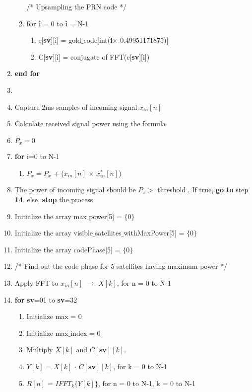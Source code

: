 \documentclass[journal,10pt,onecolumn]{article}
\begin{document}
\begin{enumerate}
\begin{enumerate}
    /* Upsampling the PRN code */
        \item[] \textbf{for} \textbf{i} = 0 to \textbf{i} = N-1
        \begin{enumerate}
            \item[] c[\textbf{sv}][i] = gold$\_$code[int(\textbf{i}$\times$ 0.49951171875)]
            \item[] C[\textbf{sv}][i] = conjugate of FFT(c[\textbf{sv}][i]) 
        \end{enumerate}
    \end{enumerate}
    \item[] \textbf{end for}
    \item[] \item Capture 2ms samples of incoming signal $x_{in}[n]$
    \item Calculate received signal power using the formula
    \item[] $P_x=0$
    \item[] \textbf{for} i=0 to N-1
    \begin{enumerate}
        \item[] $P_x= P_x$ + ($x_{in}[n]$ $\times$ $x^*_{in}[n]$)
    \end{enumerate} 
    \item The power of incoming signal should be $P_x$$>$ threshold . If true, \textbf{go to} step \textbf{14}. else, \textbf{stop} the process
    \item Initialize the array max$\_$power[5] = $\{0\}$
    \item Initialize the array visible$\_$satellites$\_$withMaxPower[5] = $\{0\}$
    \item Initialize the array codePhase[5] = $\{0\}$
    \item [] /* Find out the code phase for 5 satellites having maximum power */
    \item Apply FFT to $x_{in}[n]$ $\longrightarrow$ $X[k]$, for n = 0 to N-1
    \item \textbf{for} \textbf{sv}=01 to \textbf{sv}=32
    
    \begin{enumerate}
        \item[] Initialize max = 0
        \item[] Initialize max$\_$index = 0

            
            \item[] Multiply $X[k]$ and $C[\textbf{sv}][k ]$.
            \item[] $Y[k]$ = $X[k]$ $\cdot$ $C[\textbf{sv}][k]$, for k = 0 to N-1
            \item[] $R[n]$ =  $IFFT_k \{Y[k] \}$, for n = 0 to N-1, k = 0 to N-1
          

\end{enumerate}
\end{enumerate}
\end{document}
